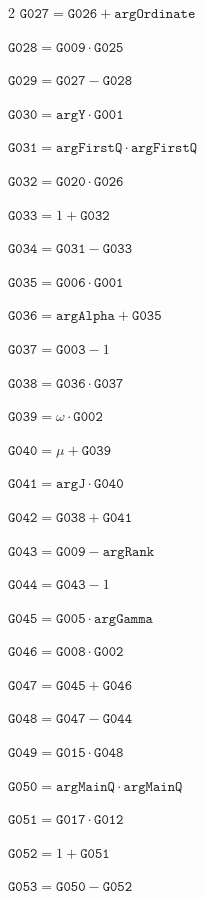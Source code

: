 \documentclass[10pt]{article}
\begin{document}
\begin{multicols}{2}
\noindent $\mathtt{G027}=\mathtt{G026}+\mathtt{argOrdinate}$\par
\noindent $\mathtt{G028}=\mathtt{G009}\cdot \mathtt{G025}$\par
\noindent $\mathtt{G029}=\mathtt{G027}-\mathtt{G028}$\par
\noindent $\mathtt{G030}=\mathtt{argY}\cdot \mathtt{G001}$\par
\noindent $\mathtt{G031}=\mathtt{argFirstQ}\cdot \mathtt{argFirstQ}$\par
\noindent $\mathtt{G032}=\mathtt{G020}\cdot \mathtt{G026}$\par
\noindent $\mathtt{G033}=1+\mathtt{G032}$\par
\noindent $\mathtt{G034}=\mathtt{G031}-\mathtt{G033}$\par
\noindent $\mathtt{G035}=\mathtt{G006}\cdot \mathtt{G001}$\par
\noindent $\mathtt{G036}=\mathtt{argAlpha}+\mathtt{G035}$\par
\noindent $\mathtt{G037}=\mathtt{G003}-1$\par
\noindent $\mathtt{G038}=\mathtt{G036}\cdot \mathtt{G037}$\par
\noindent $\mathtt{G039}=\omega\cdot \mathtt{G002}$\par
\noindent $\mathtt{G040}=\mu+\mathtt{G039}$\par
\noindent $\mathtt{G041}=\mathtt{argJ}\cdot \mathtt{G040}$\par
\noindent $\mathtt{G042}=\mathtt{G038}+\mathtt{G041}$\par
\noindent $\mathtt{G043}=\mathtt{G009}-\mathtt{argRank}$\par
\noindent $\mathtt{G044}=\mathtt{G043}-1$\par
\noindent $\mathtt{G045}=\mathtt{G005}\cdot \mathtt{argGamma}$\par
\noindent $\mathtt{G046}=\mathtt{G008}\cdot \mathtt{G002}$\par
\noindent $\mathtt{G047}=\mathtt{G045}+\mathtt{G046}$\par
\noindent $\mathtt{G048}=\mathtt{G047}-\mathtt{G044}$\par
\noindent $\mathtt{G049}=\mathtt{G015}\cdot \mathtt{G048}$\par
\noindent $\mathtt{G050}=\mathtt{argMainQ}\cdot \mathtt{argMainQ}$\par
\noindent $\mathtt{G051}=\mathtt{G017}\cdot \mathtt{G012}$\par
\noindent $\mathtt{G052}=1+\mathtt{G051}$\par
\noindent $\mathtt{G053}=\mathtt{G050}-\mathtt{G052}$\par

\end{multicols}
\end{document}
